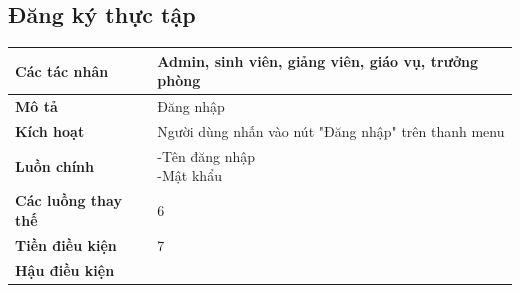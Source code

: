 \subsection{Đăng ký thực tập}
\begin{table}
    \begin{tabular}{|l|l|}
      \hline
      \textbf{Các tác nhân} & Admin, sinh viên, giảng viên, giáo vụ, trưởng phòng \\
      \hline
      \textbf{Mô tả} & Đăng nhập\\
      \hline
      \textbf{Kích hoạt} & Người dùng nhấn vào nút "Đăng nhập" trên thanh menu \\
      \hline 
      \textbf{Luồn chính} & \makecell[l]{-Tên đăng nhập \\ -Mật khẩu} \\
      \hline
      \textbf{Các luồng thay thế} & 6 \\
      \hline
      \textbf{Tiền điều kiện} & 7 \\
      \hline
      \textbf{Hậu điều kiện} & \\
      \hline
    \end{tabular}
  \end{table}
